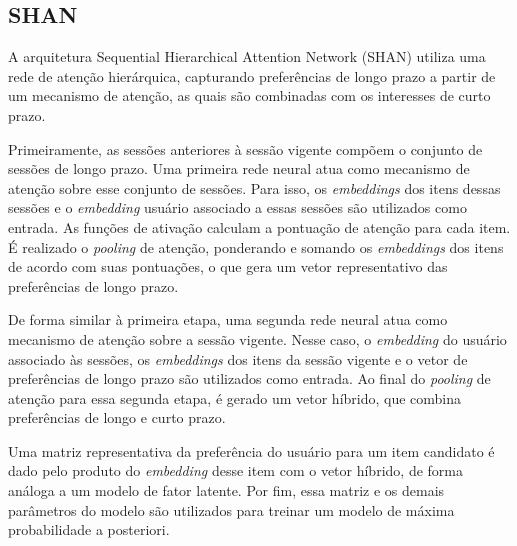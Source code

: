 \subsection{SHAN}
A arquitetura Sequential Hierarchical Attention Network (SHAN) utiliza uma rede
de atenção hierárquica, capturando preferências de longo prazo a partir de um
mecanismo de atenção, as quais são combinadas com os interesses de curto
prazo\cite{shan}.

Primeiramente, as sessões anteriores à sessão vigente compõem o conjunto de
sessões de longo prazo. Uma primeira rede neural atua como mecanismo de atenção
sobre esse conjunto de sessões. Para isso, os \textit{embeddings} dos itens
dessas sessões e o \textit{embedding} usuário associado a essas sessões são
utilizados como entrada. As funções de ativação calculam a pontuação de atenção
para cada item. É realizado o \textit{pooling} de atenção, ponderando e somando
os \textit{embeddings} dos itens de acordo com suas pontuações, o que gera um
vetor representativo das preferências de longo prazo.

De forma similar à primeira etapa, uma segunda rede neural atua como mecanismo
de atenção sobre a sessão vigente. Nesse caso, o \textit{embedding} do usuário associado
às sessões, os \textit{embeddings} dos itens da sessão vigente e o vetor de
preferências de longo prazo são utilizados como entrada. Ao final do \textit{pooling}
de atenção para essa segunda etapa, é gerado um vetor híbrido, que combina
preferências de longo e curto prazo.

Uma matriz representativa da preferência do usuário para um item candidato é
dado pelo produto do \textit{embedding} desse item com o vetor híbrido, de forma
análoga a um modelo de fator latente. Por fim, essa matriz e os demais
parâmetros do modelo são utilizados para treinar um modelo de máxima
probabilidade a posteriori.





